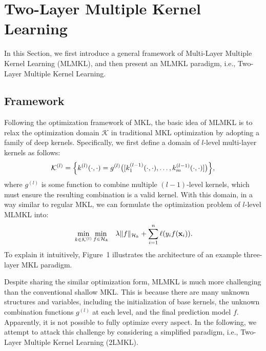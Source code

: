 \section{Two-Layer Multiple Kernel Learning}
In this Section, we first introduce a general framework of Multi-Layer Multiple Kernel Learning (MLMKL), and then present an MLMKL paradigm, i.e., Two-Layer Multiple Kernel Learning.

\subsection{Framework}

Following the optimization framework of MKL, the basic idea of MLMKL is to relax the optimization domain $\mathcal{K}$ in traditional MKL
optimization by adopting a family of deep kernels. Specifically, we first define a domain of $l$-level multi-layer kernels as follows:
\begin{equation*}
{\mathcal K}^{(l)} = \Big\{k^{(l)}(\cdot,\cdot) = g^{(l)}\big([k^{(l-1)}_1(\cdot,\cdot),\ldots,k^{(l-1)}_{m}(\cdot,\cdot)]\big)\Big\},
\end{equation*}
where $g^{(l)}$ is some function to combine multiple $(l-1)$-level kernels, which
must ensure the resulting combination is a valid kernel. With this domain, in a way
similar to regular MKL, we can formulate the optimization problem of $l$-level
MLMKL into:
\begin{eqnarray*}%
&\min_{k \in \k^{(l)}} \min_{f \in \h_k} & \lambda \|f\|_{\h_k} +  \sum_{i=1}^n\ell(y_if(\x_i)).
\label{eqn:dmkl}
\end{eqnarray*}
To explain it intuitively, Figure~1 illustrates the architecture of an example three-layer MKL paradigm.

Despite sharing the similar optimization form, MLMKL is much more challenging than the conventional shallow MKL. This is because there are many unknown structures and variables, including the initialization of base kernels, the unknown combination functions $g^{(l)}$ at each level, and the final prediction model $f$. Apparently, it is not possible to fully optimize every aspect. In the following, we attempt to attack this challenge by considering a simplified paradigm, i.e., Two-Layer Multiple Kernel Learning (2LMKL).

